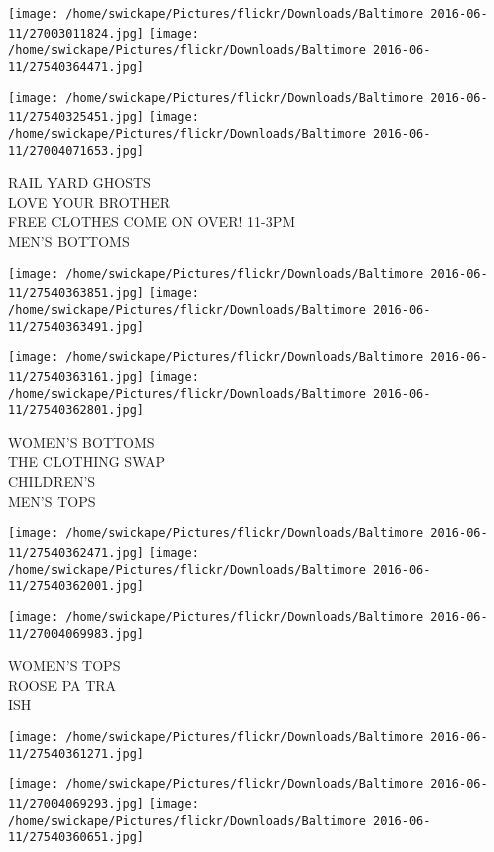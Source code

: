 \documentclass[10pt,letterpaper]{article}
\begin{document}
\texttt{[image: /home/swickape/Pictures/flickr/Downloads/Baltimore 2016-06-11/27003011824.jpg]}
\texttt{[image: /home/swickape/Pictures/flickr/Downloads/Baltimore 2016-06-11/27540364471.jpg]}

\texttt{[image: /home/swickape/Pictures/flickr/Downloads/Baltimore 2016-06-11/27540325451.jpg]}
\texttt{[image: /home/swickape/Pictures/flickr/Downloads/Baltimore 2016-06-11/27004071653.jpg]}

RAIL YARD GHOSTS\\
LOVE YOUR BROTHER\\
FREE CLOTHES COME ON OVER!  11{-}3PM\\
MEN'S BOTTOMS
\pagebreak

\texttt{[image: /home/swickape/Pictures/flickr/Downloads/Baltimore 2016-06-11/27540363851.jpg]}
\texttt{[image: /home/swickape/Pictures/flickr/Downloads/Baltimore 2016-06-11/27540363491.jpg]}

\texttt{[image: /home/swickape/Pictures/flickr/Downloads/Baltimore 2016-06-11/27540363161.jpg]}
\texttt{[image: /home/swickape/Pictures/flickr/Downloads/Baltimore 2016-06-11/27540362801.jpg]}

WOMEN'S BOTTOMS\\
THE CLOTHING SWAP\\
CHILDREN'S\\
MEN'S TOPS
\pagebreak

\texttt{[image: /home/swickape/Pictures/flickr/Downloads/Baltimore 2016-06-11/27540362471.jpg]}
\texttt{[image: /home/swickape/Pictures/flickr/Downloads/Baltimore 2016-06-11/27540362001.jpg]}

\texttt{[image: /home/swickape/Pictures/flickr/Downloads/Baltimore 2016-06-11/27004069983.jpg]}

WOMEN'S TOPS\\
ROOSE PA TRA\\
ISH
\pagebreak

\texttt{[image: /home/swickape/Pictures/flickr/Downloads/Baltimore 2016-06-11/27540361271.jpg]}

\vspace{0.25in}
\texttt{[image: /home/swickape/Pictures/flickr/Downloads/Baltimore 2016-06-11/27004069293.jpg]}
\texttt{[image: /home/swickape/Pictures/flickr/Downloads/Baltimore 2016-06-11/27540360651.jpg]}
\end{document}
